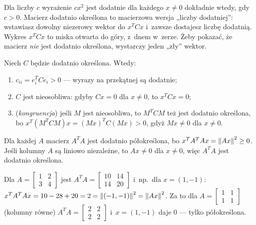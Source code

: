 \documentclass[11pt]{article}
\begin{document}
\begin{poludzku}
Dla liczby $c$ wyrażenie $cx^2$ jest dodatnie dla każdego $x\ne0$
dokładnie wtedy, gdy $c>0$. Macierz dodatnio określona to macierzowa
wersja „liczby dodatniej”: wstawiasz dowolny niezerowy wektor do
$x^TCx$ i~zawsze dostajesz liczbę dodatnią. Wykres $x^TCx$ to miska
otwarta do góry, z~dnem w~zerze. Żeby pokazać, że macierz \emph{nie}
jest dodatnio określona, wystarczy jeden „zły” wektor.
\end{poludzku}

\begin{fakt}\label{fakt:proste}
Niech $C$ będzie dodatnio określona. Wtedy:
\begin{enumerate}
\item $c_{ii}=e_i^TCe_i>0$ --- wyrazy na przekątnej są dodatnie;
\item $C$ jest nieosobliwa: gdyby $Cx=0$ dla $x\ne0$, to $x^TCx=0$;
\item (\emph{kongruencja}) jeśli $M$ jest nieosobliwa, to $M^TCM$ też jest
dodatnio określona, bo
$x^T(M^TCM)x=(Mx)^TC(Mx)>0$, gdyż $Mx\ne0$ dla $x\ne0$.
\end{enumerate}
\end{fakt}

\begin{fakt}[z~wykładu]
Dla każdej $A$ macierz $A^TA$ jest dodatnio półokreślona, bo
$x^TA^TAx=\left\lVert Ax \right\rVert^2\ge0$. Jeśli kolumny $A$ są liniowo niezależne, to
$Ax\ne0$ dla $x\ne0$, więc $A^TA$ jest dodatnio określona.
\end{fakt}

\begin{przyklad}
Dla $A=\left[\begin{smallmatrix}1&2\\3&4\end{smallmatrix}\right]$ jest
$A^TA=\left[\begin{smallmatrix}10&14\\14&20\end{smallmatrix}\right]$
i~np.\ dla $x=(1,-1)$: $x^TA^TAx=10-28+20=2=\left\lVert (-1,-1) \right\rVert^2=\left\lVert Ax \right\rVert^2$.
Za to dla $A=\left[\begin{smallmatrix}1&1\\1&1\end{smallmatrix}\right]$
(kolumny równe) $A^TA=\left[\begin{smallmatrix}2&2\\2&2\end{smallmatrix}
\right]$ i~$x=(1,-1)$ daje $0$ --- tylko półokreślona.
\end{przyklad}
\end{document}
